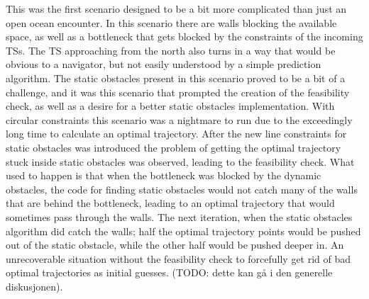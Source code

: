 This was the first scenario designed to be a bit more complicated than just an open ocean encounter. In this scenario there are
walls blocking the available space, as well as a bottleneck that gets blocked by the constraints of the incoming TSs. The TS approaching from the
north also turns in a way that would be obvious to a navigator, but not easily understood by a simple prediction algorithm. The static obstacles
present in this scenario proved to be a bit of a challenge, and it was this scenario that prompted the creation of the feasibility check, as well as
a desire for a better static obstacles implementation. With circular constraints this scenario was a nightmare to run due to the exceedingly long
time to calculate an optimal trajectory. After the new line constraints for static obstacles was introduced the problem of getting the optimal trajectory
stuck inside static obstacles was observed, leading to the feasibility check. What used to happen is that when the bottleneck
was blocked by the dynamic obstacles, the code for finding static obstacles would not catch many of the walls that are behind the bottleneck, leading to
an optimal trajectory that would sometimes pass through the walls. The next iteration, when the static obstacles algorithm did catch the walls; half
the optimal trajectory points would be pushed out of the static obstacle, while the other half would be pushed deeper in. An unrecoverable situation without
the feasibility check to forcefully get rid of bad optimal trajectories as initial guesses. (TODO: dette kan gå i den generelle diskusjonen).

